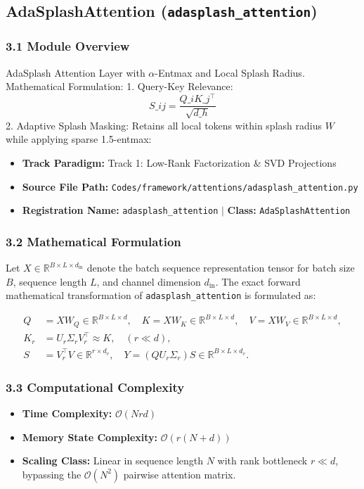 \subsection{AdaSplashAttention (\texttt{adasplash\_attention})}
\label{sec:app_module_adasplash\_attention}

\subsubsection*{3.1 Module Overview}
AdaSplash Attention Layer with $\alpha$-Entmax and Local Splash Radius.  Mathematical Formulation:     1. Query-Key Relevance:        $$S\_{ij} = \frac{Q\_i K\_j^\top}{\sqrt{d\_h}}$$          2. Adaptive Splash Masking:        Retains all local tokens within splash radius $W$ while applying sparse 1.5-entmax: 
\begin{itemize}
    \item \textbf{Track Paradigm:} Track 1: Low-Rank Factorization & SVD Projections
    \item \textbf{Source File Path:} \texttt{Codes/framework/attentions/adasplash\_attention.py}
    \item \textbf{Registration Name:} \texttt{adasplash\_attention} $\mid$ \textbf{Class:} \texttt{AdaSplashAttention}
\end{itemize}

\subsubsection*{3.2 Mathematical Formulation}
Let $X \in \mathbb{R}^{B \times L \times d_{\text{in}}}$ denote the batch sequence representation tensor for batch size $B$, sequence length $L$, and channel dimension $d_{\text{in}}$. The exact forward mathematical transformation of \texttt{adasplash\_attention} is formulated as:

\begin{align}
Q &= X W_Q \in \mathbb{R}^{B \times L \times d}, \quad K = X W_K \in \mathbb{R}^{B \times L \times d}, \quad V = X W_V \in \mathbb{R}^{B \times L \times d}, \\
K_r &= U_r \Sigma_r V_r^\top \approx K, \quad (r \ll d), \\
S &= V_r^\top V \in \mathbb{R}^{r \times d_v}, \quad Y = (Q U_r \Sigma_r) S \in \mathbb{R}^{B \times L \times d_v}.
\end{align}


\subsubsection*{3.3 Computational Complexity}
\begin{itemize}
    \item \textbf{Time Complexity:} $\mathcal{O}(N r d)$
    \item \textbf{Memory State Complexity:} $\mathcal{O}(r(N + d))$
    \item \textbf{Scaling Class:} Linear in sequence length $N$ with rank bottleneck $r \ll d$, bypassing the $\mathcal{O}(N^2)$ pairwise attention matrix.
\end{itemize}

